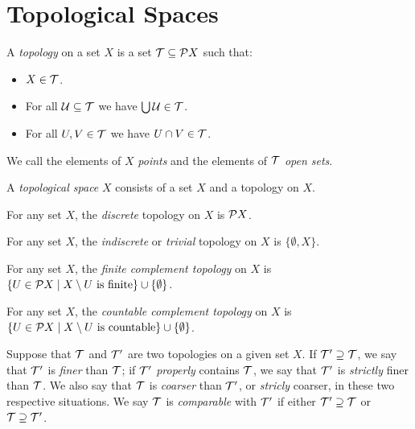 \section{Topological Spaces}

\begin{definition}[Topology]
    A \emph{topology} on a set $X$ is a set $\mathcal{T} \subseteq \mathcal{P} X$ such that:
    \begin{itemize}
        \item $X \in \mathcal{T}$.
        \item For all $\mathcal{U} \subseteq \mathcal{T}$ we have $\bigcup \mathcal{U} \in \mathcal{T}$.
        \item For all $U, V \in \mathcal{T}$ we have $U \cap V \in \mathcal{T}$.
    \end{itemize}
    We call the elements of $X$ \emph{points} and the elements of $\mathcal{T}$ \emph{open sets}.
\end{definition}

\begin{definition}
    A \emph{topological space} $X$ consists of a set $X$ and a topology on $X$.
\end{definition}

\begin{definition}
    For any set $X$, the \emph{discrete} topology on $X$ is $\mathcal{P} X$.
\end{definition}

\begin{definition}
    For any set $X$, the \emph{indiscrete} or \emph{trivial} topology on $X$ is $\{ \emptyset, X \}$.
\end{definition}

\begin{definition}
    For any set $X$, the \emph{finite complement topology} on $X$ is $\{ U \in \mathcal{P} X \mid X \setminus U \text{ is finite} \} 
    \cup \{ \emptyset \}$.
\end{definition}

\begin{definition}
    For any set $X$, the \emph{countable complement topology} on $X$ is $\{ U \in \mathcal{P} X \mid X \setminus U \text{ is countable} \} 
    \cup \{ \emptyset \}$.
\end{definition}

\begin{definition}
    Suppose that $\mathcal{T}$ and $\mathcal{T}'$ are two topologies on a given set $X$. If $\mathcal{T}' \supseteq \mathcal{T}$, we say that $\mathcal{T}'$ is \emph{finer} than
    $\mathcal{T}$; if $\mathcal{T}'$ \emph{properly} contains $\mathcal{T}$, we say that $\mathcal{T}'$ is \emph{strictly} finer than $\mathcal{T}$. We also say that $\mathcal{T}$ is
    \emph{coarser} than $\mathcal{T}'$, or \emph{stricly} coarser, in these two respective situations. We say $\mathcal{T}$ is \emph{comparable} with
    $\mathcal{T}'$ if either $\mathcal{T}' \supseteq \mathcal{T}$ or $\mathcal{T} \supseteq \mathcal{T}'$.
\end{definition}

